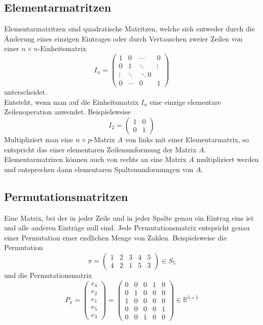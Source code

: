 \documentclass[9pt]{article} %
\begin{document}
\subsection{Elementarmatritzen}
Elementarmatritzen sind quadratische Matritzen, welche sich entweder durch die Änderung eines einzigen Eintrages oder durch Vertauschen zweier Zeilen von einer $n \times n$-Einheitsmatrix \[
I_n = \begin{pmatrix}
1 & 0 & \cdots & 0 \\
0 & 1  &  \ddots & \vdots \\
\vdots &  \ddots &  \ddots 0 \\
0 & \cdots & 0 & 1
\end{pmatrix}
\]
unterscheidet. \\
Entsteht, wenn man auf die Einheitsmatrix $I_n$ eine einzige elementare Zeilenoperation anwendet. Beispielsweise
\[
I_2 = \begin{pmatrix}
1 & 0 \\
0 & 1
\end{pmatrix}
\]
Multipliziert man eine $n \times p$-Matrix $A$ von links mit einer Elementarmatrix, so entspricht das einer elementaren Zeilenumformung der Matrix $A$. Elementarmatrizen können auch von rechts an eine Matrix $A$ multipliziert werden und entsprechen dann elementaren Spaltenumformungen von $A$. 
\cite{Einheitsmatrix} \cite{Elementarmatrix} 
\subsection{Permutationsmatritzen}
Eine Matrix, bei der in jeder Zeile und in jeder Spalte genau ein Eintrag eins ist und alle anderen Einträge null sind. Jede Permutationsmatrix entspricht genau einer Permutation einer endlichen Menge von Zahlen. \cite{Permutationsmatrix}
Beispielsweise die Permutation
\[
\pi = \begin{pmatrix} 1 & 2 & 3 & 4 & 5 \\
4 & 2 & 1 & 5 & 3 \end{pmatrix} \in S_5
\]
und die Permutationsmatrix
\[
P_{\pi} = \begin{pmatrix}
    e_4 \\
    e_2 \\
    e_1 \\
    e_5 \\
    e_3
\end{pmatrix}
= \begin{pmatrix}
    0 & 0 & 0 & 1 & 0 \\
    0 & 1 & 0 & 0 & 0 \\
    1 & 0 & 0 & 0 & 0 \\
    0 & 0 & 0 & 0 & 1 \\
    0 & 0 & 1 & 0 & 0
\end{pmatrix}
\in \mathbb{R}^{5 \times 5}
\]
\end{document}
